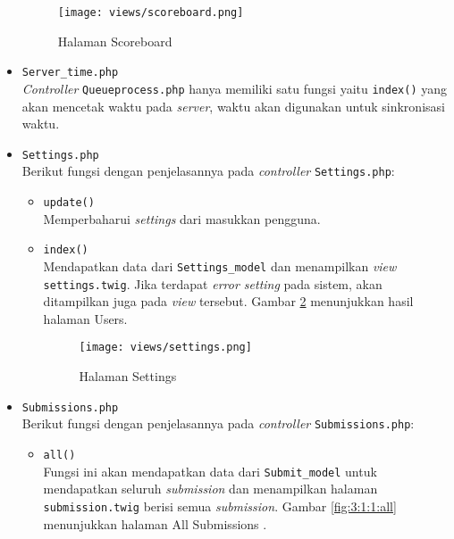 \begin{itemize}
	      \begin{figure}[H]
		      \centering
		      \texttt{[image: views/scoreboard.png]}
		      \caption{Halaman Scoreboard}
		      \label{fig:3:1:1:scoreboard}
	      \end{figure}

	\item \verb|Server_time.php| \\
	      \textit{Controller} \verb|Queueprocess.php| hanya memiliki satu fungsi yaitu \verb|index()| yang akan mencetak waktu pada \textit{server}, waktu akan digunakan untuk sinkronisasi waktu.

	\item \verb|Settings.php| \\
	      Berikut fungsi dengan penjelasannya pada \textit{controller} \verb|Settings.php|:

	      \begin{itemize}
		      \item \verb|update()| \\
		            Memperbaharui \textit{settings} dari masukkan pengguna.
		      \item \verb|index()| \\
		            Mendapatkan data dari \verb|Settings_model| dan menampilkan \textit{view} \verb|settings.twig|. Jika terdapat \textit{error setting} pada sistem, akan ditampilkan juga pada \textit{view} tersebut. Gambar \ref{fig:3:1:1:settings} menunjukkan hasil halaman Users.

		            \begin{figure}[H]
			            \centering
			            \texttt{[image: views/settings.png]}
			            \caption{Halaman Settings}
			            \label{fig:3:1:1:settings}
		            \end{figure}

	      \end{itemize}

	\item \verb|Submissions.php| \\
	      Berikut fungsi dengan penjelasannya pada \textit{controller} \verb|Submissions.php|:

	      \begin{itemize}
		      \item \verb|all()| \\
		            Fungsi ini akan mendapatkan data dari \verb|Submit_model| untuk mendapatkan seluruh \textit{submission} dan menampilkan halaman \verb|submission.twig| berisi semua \textit{submission}. Gambar \ref{fig:3:1:1:all} menunjukkan halaman All Submissions .


\end{itemize}
\end{itemize}
